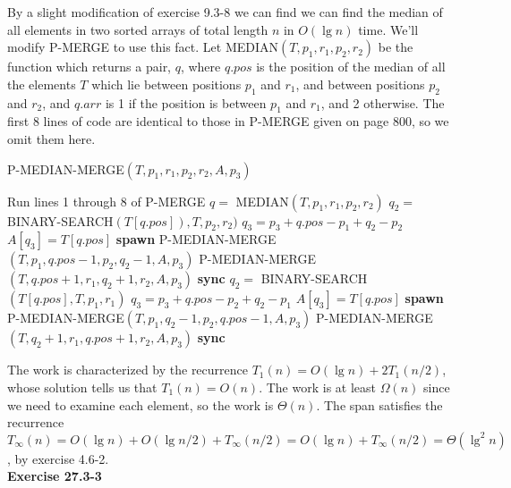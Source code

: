 \documentclass{article}
\begin{document}
By a slight modification of exercise 9.3-8 we can find we can find the median of all elements in two sorted arrays of total length $n$ in $O(\lg n)$ time.  We'll modify P-MERGE to use this fact.  Let MEDIAN$(T,p_1,r_1,p_2,r_2)$ be the function which returns a pair, $q$, where $q.pos$ is the position of the median of all the elements $T$ which lie between positions $p_1$ and $r_1$, and between positions $p_2$ and $r_2$, and $q.arr$ is 1 if the position is between $p_1$ and $r_1$, and 2 otherwise.  The first 8 lines of code are identical to those in P-MERGE given on page 800, so we omit them here.\\

\begin{algorithm}
\caption{P-MEDIAN-MERGE$(T,p_1,r_1,p_2,r_2,A,p_3)$}
\begin{algorithmic}[1]
\State Run lines 1 through 8 of P-MERGE
\State $q =$  MEDIAN$(T,p_1,r_1,p_2,r_2)$
	\State $q_2 = $ BINARY-SEARCH$(T[q.pos]), T, p_2, r_2)$
	\State $q_3 = p_3 + q.pos - p_1 + q_2 - p_2$
	\State $A[q_3] = T[q.pos]$
	\State \textbf{spawn} P-MEDIAN-MERGE$(T, p_1, q.pos - 1, p_2, q_2 - 1, A,p_3)$
	\State P-MEDIAN-MERGE$(T, q.pos + 1, r_1, q_2 + 1, r_2, A,p_3)$
	\State \textbf{sync}
\Else
	\State $q_2 = $ BINARY-SEARCH$(T[q.pos],T,p_1,r_1)$
	\State $q_3 = p_3 + q.pos - p_2 + q_2 - p_1$
	\State $A[q_3] = T[q.pos]$
	\State \textbf{spawn} P-MEDIAN-MERGE$(T, p_1, q_2 - 1, p_2, q.pos - 1, A,p_3)$
	\State P-MEDIAN-MERGE$(T, q_2 + 1, r_1, q.pos + 1, r_2, A,p_3)$
	\State \textbf{sync}
\EndIf
\end{algorithmic}
\end{algorithm}

The work is characterized by the recurrence $T_1(n) = O(\lg n) + 2T_1(n/2)$, whose solution tells us that $T_1(n) = O(n)$.  The work is at least $\Omega(n)$ since we need to examine each element, so the work is $\Theta(n)$.  The span satisfies the recurrence $T_\infty(n) = O(\lg n) + O(\lg n/2) + T_\infty(n/2) = O(\lg n) + T_\infty(n/2) = \Theta(\lg^2 n)$, by exercise 4.6-2. \\  

\noindent\textbf{Exercise 27.3-3}\\
\end{document}
